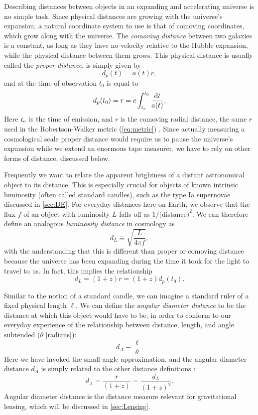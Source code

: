 Describing distances between objects in an expanding and accelerating universe is no simple task. Since physical distances are growing with the universe's expansion, a natural coordinate system to use is that of comoving coordinates, which grow along with the universe. The {\it comoving distance} between two galaxies is a constant, as long as they have no velocity relative to the Hubble expansion, while the physical distance between them grows. This physical distance is usually called the {\it proper distance}, is simply given by
\begin{equation}
d_p(t) = a(t) r,
\end{equation}
and at the time of observation $t_0$ is equal to
\begin{equation}
d_p(t_0) = r = c \int_{t_{\rm e}}^{t_0} \frac{{\rm d}t}{a(t)}.
\end{equation}
Here $t_{\rm e}$ is the time of emission, and $r$ is the comoving radial distance, the same $r$ used in the Robertson-Walker metric (\autoref{eq:metric}) \citep{RydenText}. Since actually measuring a cosmological scale proper distance would require us to pause the universe's expansion while we extend an enormous tape measurer, we have to rely on other forms of distance, discussed below. 

Frequently we want to relate the apparent brightness of a distant astronomical object to its distance. This is especially crucial for objects of known intrinsic luminosity (often called standard candles), such as the type Ia supernovae discussed in \autoref{sec:DE}. For everyday distances here on Earth, we observe that the flux $f$ of an object with luminosity $L$ falls off as $1/($distance$)^2$. We can therefore define an analogous {\it luminosity distance} in cosmology as
\begin{equation}
\label{eqn:dL}
d_L \equiv \sqrt{\frac{L}{4\pi f}},
\end{equation}
with the understanding that this is different than proper or comoving distance because the universe has been expanding during the time it took for the light to travel to us. In fact, this implies the relationship
\begin{equation}
d_L = (1+z)r = (1+z)d_p(t_0).
\end{equation}

Similar to the notion of a standard candle, we can imagine a standard ruler of a fixed physical length $\ell$. We can define the {\it angular diameter distance} to be the distance at which this object would have to be, in order to conform to our everyday experience of the relationship between distance, length, and angle subtended ($\theta$ [radians]):
\begin{equation}
d_A \equiv \frac{\ell}{\theta}.
\end{equation}
Here we have invoked the small angle approximation, and the angular diameter distance $d_A$ is simply related to the other distance definitions \citep{RydenText}:
\begin{equation}
d_A = \frac{r}{(1+z)}= \frac{d_L}{(1+z)^2}.
\end{equation}
Angular diameter distance is the distance measure relevant for gravitational lensing, which will be discussed in \autoref{sec:Lensing}.


